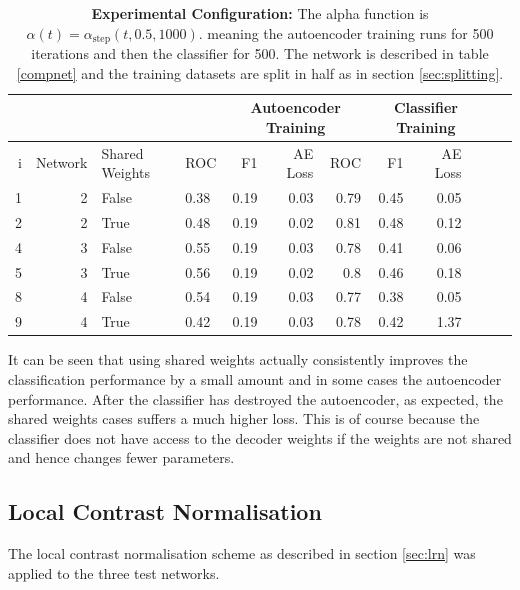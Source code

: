       \begin{table}[!h] \centering
      {\small
      \begin{tabular}{rrllrrrrrrrr}
        &&&&   \multicolumn{3}{|c|}{Autoencoder Training} &  \multicolumn{3}{c|}{Classifier Training}    \\
      \hline
        i & Network               &   Shared Weights &    ROC&F1&AE Loss & ROC & F1 & AE Loss \\
      \hline
       1 & 2    & False     &    0.38 &   0.19 &     0.03 &    0.79 &   0.45 &     0.05 \\
       2 & 2    & True      &    0.48 &   0.19 &     0.02 &    0.81 &   0.48 &     0.12 \\
      \hline
      4 & 3    & False     &    0.55 &   0.19 &     0.03 &    0.78 &   0.41 &     0.06 \\
      5 & 3    & True      &    0.56 &   0.19 &     0.02 &    0.8  &   0.46 &     0.18 \\
      \hline
      8 & 4     & False     &    0.54 &   0.19 &     0.03 &    0.77 &   0.38 &     0.05 \\
      9 & 4     & True      &    0.42 &   0.19 &     0.03 &    0.78 &   0.42 &     1.37 \\
       \hline
      \end{tabular}}\caption{{\bf Experimental Configuration:}
      The alpha function is $\alpha(t)=\alpha_{\text{step}}(t,0.5,1000)$.
      meaning the autoencoder training runs for 500 iterations and then the classifier for 500.
      The network is described in table \ref{compnet} and the training datasets are split in half as in section
      \ref{sec:splitting}.} \label{tab:sharedweights} \end{table}

      It can be seen that using shared weights actually consistently improves the classification
      performance by a small amount and in some cases the autoencoder performance. After the classifier has
      destroyed the autoencoder, as expected, the shared weights cases suffers a much higher loss. This is of course
      because the classifier does not have access to the decoder weights if the weights are not shared and hence
      changes fewer parameters.
    \subsection{Local Contrast Normalisation}

      The local contrast normalisation scheme as described in section \ref{sec:lrn}
      was applied to the three test networks.


